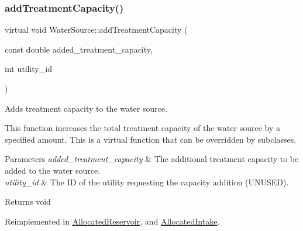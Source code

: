 \mbox{\label{classWaterSource_ac2bc1a09fce3a3201d62a73052b27b0b}} 
\subsubsection{\texorpdfstring{add\+Treatment\+Capacity()}{addTreatmentCapacity()}}
{\footnotesize\ttfamily virtual void Water\+Source\+::add\+Treatment\+Capacity (\begin{DoxyParamCaption}\item[{const double}]{added\+\_\+treatment\+\_\+capacity,  }\item[{int}]{utility\+\_\+id }\end{DoxyParamCaption})\hspace{0.3cm}{\ttfamily [virtual]}}



Adds treatment capacity to the water source. 

This function increases the total treatment capacity of the water source by a specified amount. This is a virtual function that can be overridden by subclasses.


\begin{DoxyParams}{Parameters}
{\em added\+\_\+treatment\+\_\+capacity} & The additional treatment capacity to be added to the water source. \\
\hline
{\em utility\+\_\+id} & The ID of the utility requesting the capacity addition (U\+N\+U\+S\+ED).\\
\hline
\end{DoxyParams}
\begin{DoxyReturn}{Returns}
void 
\end{DoxyReturn}


Reimplemented in \mbox{\hyperlink{classAllocatedReservoir_ab781bee3253277f1dcfa4c12756d9d6f}{Allocated\+Reservoir}}, and \mbox{\hyperlink{classAllocatedIntake_ae16939ed474e15b9c68edcbf61696231}{Allocated\+Intake}}.

\mbox{\label{classWaterSource_ac070445379fe706f65b977dade4f3fbc}} 
